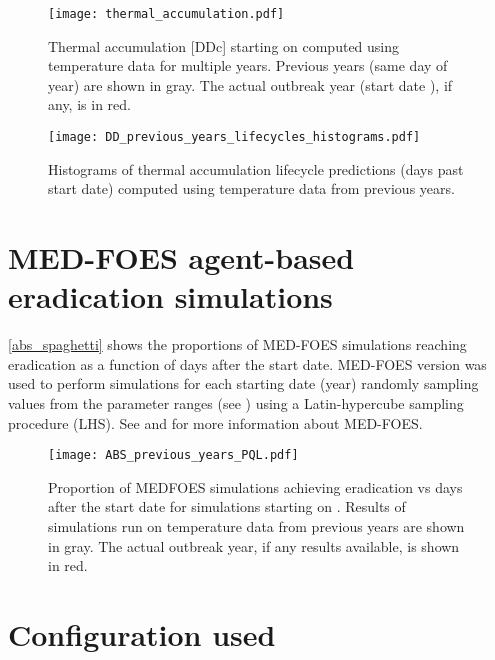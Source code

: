 \documentclass[10pt]{article}
\begin{document}
\begin{figure}[H]
\centering
\texttt{[image: thermal\_accumulation.pdf]}
\caption{
\label{dd_spaghetti}
Thermal accumulation [DDc] starting on \VarStartDOY 
computed using \VarStation temperature data for multiple years.
Previous years (same day of year) are shown in gray.
The actual outbreak year (start date \VarStartDate), if any, is in red.}
\end{figure}

\begin{figure}[H]
\centering
\texttt{[image: DD\_previous\_years\_lifecycles\_histograms.pdf]}
\caption{
\label{dd_hists}
Histograms of thermal accumulation lifecycle predictions (days past start date) 
computed using temperature data from previous years.
}
\end{figure}

\section*{MED-FOES agent-based eradication simulations}

\autoref{abs_spaghetti} shows the proportions of MED-FOES simulations 
reaching eradication as a function of days after the start date.
MED-FOES version \VarMEDFOESVersion was used 
to perform \VarMFPnR simulations for each starting date (year)
randomly sampling values from the parameter ranges (see )
using a Latin-hypercube sampling procedure (LHS).
See \citet{manoukis_computer_2014} and \citet{manoukis_agent-based_2014} %
for more information about MED-FOES.


\begin{figure}[H]
\centering
\texttt{[image: ABS\_previous\_years\_PQL.pdf]}
\caption{
\label{abs_spaghetti}
Proportion of MEDFOES simulations achieving eradication vs days after the start date 
for simulations starting on \VarStartDOY.
Results of simulations run on temperature data from previous years are shown in gray.
The actual outbreak year, if any results available, is shown in red.
}
\end{figure}


\nocite{*}

{\small
}

\clearpage
\section*{Configuration used}\label{configuration}
%


%
\end{document}
